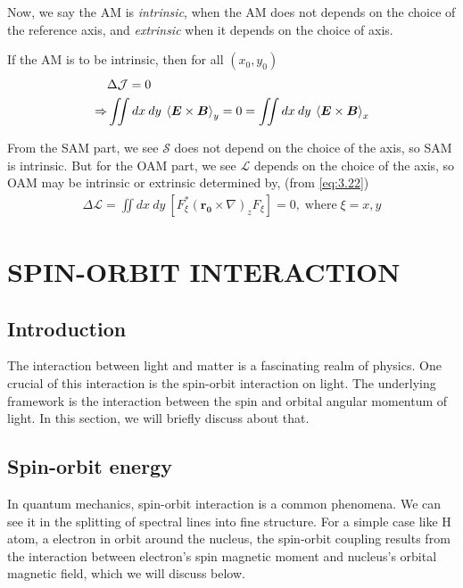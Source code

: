 \documentclass[11pt,a4paper]{article}
\numberwithin{equation}{section}
\begin{document}
Now, we say the AM is \textit{intrinsic}, when the AM does not depends on the choice of the reference axis, and \textit{extrinsic} when it depends on the choice of axis.

If the AM is to be intrinsic, then for all $(x_0,y_0)$
\begin{align}
	&\Delta\mathcal{J}=0\nonumber\\
	\Rightarrow &\iint  dx\:dy\: \expval{\boldsymbol{E}\times\boldsymbol{B}}_y = 0 = \iint  dx\:dy\: \expval{\boldsymbol{E}\times\boldsymbol{B}}_x \label{eq:3.40}
\end{align} 

From the SAM part, we see $\mathcal{S}$ does not depend on the choice of the axis, so SAM is intrinsic. But for the OAM part, we see $\mathcal{L}$ depends on the choice of the axis, so OAM may be intrinsic or extrinsic determined by, (from \ref{eq:3.22})
\begin{align}
	\Delta \mathcal{L}=
	\iint  dx\:dy\: \left[F_\xi^\ast\left(\boldsymbol{r_0}\times\nabla\right)_zF_\xi\right] = 0, \;\text{where}\;\xi=x,y
\end{align}



\clearpage

\section{SPIN-ORBIT INTERACTION}

\subsection{Introduction}
The interaction between light and matter is a fascinating realm of physics. One crucial of this interaction is the spin-orbit interaction on light. The underlying framework is the interaction between the spin and  orbital angular momentum of light. In this section, we will briefly discuss about that.
\subsection{Spin-orbit energy}
In quantum mechanics, spin-orbit interaction is a common phenomena. We can see it in the splitting of spectral lines into fine structure. For a simple case like H atom, a electron in orbit around the nucleus, the spin-orbit coupling results from the interaction between electron's spin magnetic moment and nucleus's orbital magnetic field, which we will discuss below. \cite{WO}\cite{zettili 09} 
\end{document}
